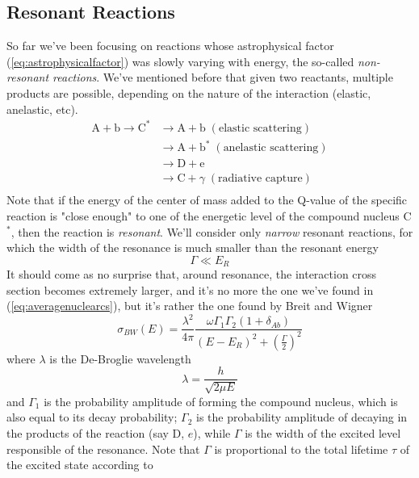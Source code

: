 \subsection{Resonant Reactions}
So far we've been focusing on reactions whose astrophysical factor (\ref{eq:astrophysicalfactor}) was slowly varying with energy, the so-called \emph{non-resonant reactions}. We've mentioned before that given two reactants, multiple products are possible, depending on the nature of the interaction (elastic, anelastic, etc).
\begin{align*}
    \text{A}+\text{b} \to \text{C}^{*} &\to \text{A}+\text{b} \; (\text{elastic scattering})\\
                  &\to \text{A}+\text{b}^{*}\; (\text{anelastic scattering})\\
                  &\to \text{D}+\text{e}\\
                  &\to \text{C}+\gamma\; (\text{radiative capture})\\
\end{align*}
Note that if the energy of the center of mass added to the Q-value of the specific reaction is "close enough" to one of the energetic level of the compound nucleus C$^{*}$, then the reaction is \emph{resonant}. We'll consider only \emph{narrow} resonant reactions, for which the width of the resonance is much smaller than the resonant energy 
\begin{equation}
    \Gamma \ll E_{R}
    \label{eq:narrowresonance}
\end{equation}
It should come as no surprise that, around resonance, the interaction cross section becomes extremely larger, and it's no more the one we've found in (\ref{eq:averagenuclearcs}), but it's rather the one found by Breit and Wigner
\begin{equation}
    \sigma_{BW}(E) = \frac{\lambda^{2}}{4\pi}\frac{\omega\Gamma_{1}\Gamma_{2}(1+\delta_{Ab})}{(E-E_{R})^{2}+\left(\frac{\Gamma}{2}\right)^{2}}
    \label{eq:breitwignercs}
\end{equation}
where $\lambda$ is the De-Broglie wavelength
\begin{equation}
    \lambda = \frac{h}{\sqrt{2\mu E}}
    \label{eq:debrogliewavelength}
\end{equation}
and $\Gamma_{1}$ is the probability amplitude of forming the compound nucleus, which is also equal to its decay probability; $\Gamma_{2}$ is the probability amplitude of decaying in the products of the reaction (say D, $e$), while $\Gamma$ is the width of the excited level responsible of the resonance. Note that $\Gamma$ is proportional to the total lifetime $\tau$ of the excited state according to 
